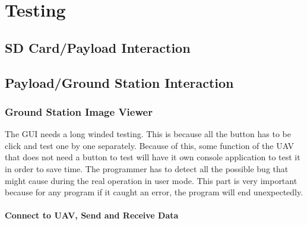 \chapter{Testing}



\section{SD Card/Payload Interaction}

\section{Payload/Ground Station Interaction}

\subsection{Ground Station Image Viewer}
The GUI needs a long winded testing. This is because all the button has to be click and test one by one separately. Because of this, some function of the UAV that does not need a button to test will have it own console application to test it in order to save time. The programmer has to detect all the possible bug that might cause during the real operation in user mode. This part is very important because for any program if it caught an error, the program will end unexpectedly.
\subsubsection{Connect to UAV, Send and Receive Data}

